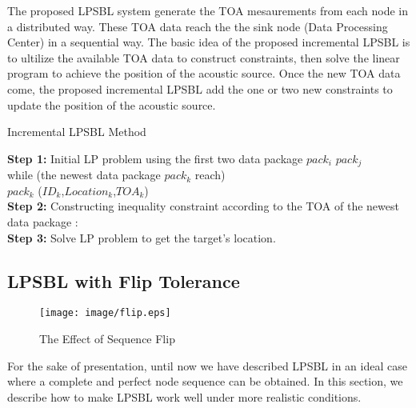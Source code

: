 The proposed LPSBL system generate the TOA mesaurements from each node in a distributed way.
These TOA data reach the the sink node (Data Processing Center) in a sequential way.
The basic idea of the proposed incremental LPSBL is to ultilize the available TOA data to construct constraints, then solve the linear program to achieve the position of the acoustic source.
Once the new TOA data come, the proposed incremental LPSBL add the one or two new constraints to update the position of the acoustic source.
\begin{algorithm}
\caption{Incremental LPSBL Method}
 
 \textbf{Step 1:}  Initial LP problem using the first two data package $pack_i$ $pack_j$ \\
          while (the newest data package $pack_k$ reach)\\		 
		   $pack_k$ ($ID_k$,$Location_k$,$TOA_k$)\\
\textbf{Step 2:}  Constructing inequality constraint according to the TOA of the newest data package : \\ 

\textbf{Step 3:} Solve LP problem to get the target's location.\\
       
 
 \end{algorithm}


 


\subsection{LPSBL with Flip Tolerance }

    \begin{figure}[!htb]
    \centering
 \setlength{\abovecaptionskip}{-15pt}
    \texttt{[image: image/flip.eps]} 
	\vspace{10mm}
    \caption{The Effect of Sequence Flip}
	\label{fig2}
    \vspace{-5mm}
    \end{figure}

For the sake of presentation, until now we have described LPSBL in an ideal case where a complete and perfect node sequence can be obtained. 
In this section, we describe how to make LPSBL work well under more realistic conditions. 

